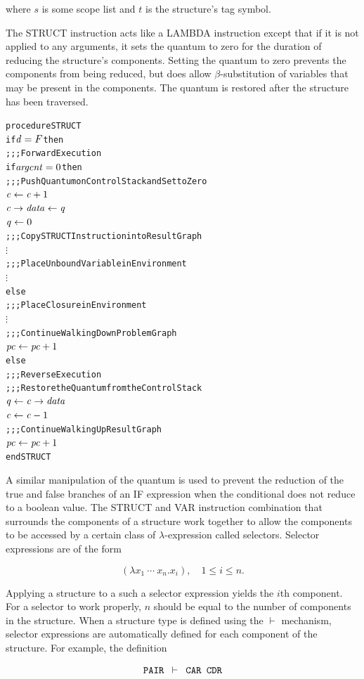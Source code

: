 where \(s\) is some scope list and \(t\) is the structure's tag symbol.

The STRUCT instruction acts like a LAMBDA instruction except that if it is not applied to
any arguments, it sets the quantum to zero for the duration of reducing the structure's
components. Setting the quantum to zero prevents the components from being reduced, but
does allow \(\beta\)-substitution of variables that may be present in the components. The
quantum is restored after the structure has been traversed.

\begin{alltt}
procedure STRUCT
  if \(\rt{d} = F\) then
    ;;; Forward Execution
    if \(\rt{argcnt} = 0\) then
      ;;; Push Quantum on Control Stack and Set to Zero
      \(\rt{c} \leftarrow \rt{c}+1\)
      \(\rtfield{c}{data} \leftarrow \rt{q}\)
      \(\rt{q} \leftarrow 0\)
      ;;; Copy STRUCT Instruction into Result Graph
      \(\vdots\)
      ;;; Place Unbound Variable in Environment
      \(\vdots\)
    else
      ;;; Place Closure in Environment
      \(\vdots\)
    ;;; Continue Walking Down Problem Graph
    \(\rt{pc} \leftarrow \rt{pc}+1\)
  else
    ;;; Reverse Execution
    ;;; Restore the Quantum from the Control Stack
    \(\rt{q} \leftarrow \rtfield{c}{data}\)
    \(\rt{c} \leftarrow \rt{c}-1\)
    ;;; Continue Walking Up Result Graph
    \(\rt{pc} \leftarrow \rt{pc}+1\)
end STRUCT
\end{alltt}

A similar manipulation of the quantum is used to prevent the reduction of the true and
false branches of an IF expression when the conditional does not reduce to a boolean value.
The STRUCT and VAR instruction combination that surrounds the components of a structure
work together to allow the components to be accessed by a certain class of
\(\lambda\)-expression called selectors. Selector expressions are of the form

\[
(\lambda x_1\ \cdots\ x_n.x_i),\quad 1 \leq i \leq n.
\]


Applying a structure to a such a selector expression yields the \(i\)th component. For a
selector to work properly, \(n\) should be equal to the number of components in the
structure. When a structure type is defined using the \(\vdash\) mechanism, selector
expressions are automatically defined for each component of the structure. For example,
the definition

\[
\texttt{PAIR }\vdash\texttt{ CAR CDR}
\]


